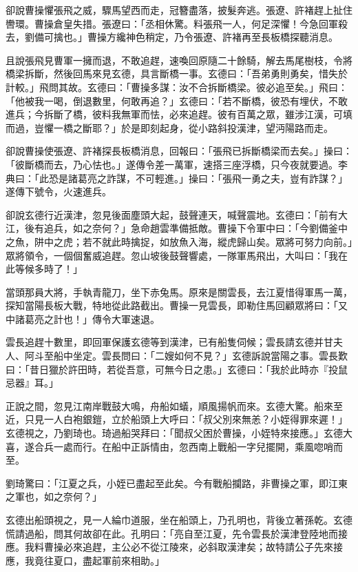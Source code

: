 卻說曹操懼張飛之威，驟馬望西而走，冠簪盡落，披髮奔逃。張遼、許褚趕上扯住轡環。曹操倉皇失措。張遼曰：「丞相休驚。料張飛一人，何足深懼！今急回軍殺去，劉備可擒也。」曹操方纔神色稍定，乃令張遼、許褚再至長板橋探聽消息。

且說張飛見曹軍一擁而退，不敢追趕，速喚回原隨二十餘騎，解去馬尾樹枝，令將橋梁拆斷，然後回馬來見玄德，具言斷橋一事。玄德曰：「吾弟勇則勇矣，惜失於計較。」飛問其故。玄德曰：「曹操多謀：汝不合拆斷橋梁。彼必追至矣。」飛曰：「他被我一喝，倒退數里，何敢再追？」玄德曰：「若不斷橋，彼恐有埋伏，不敢進兵；今拆斷了橋，彼料我無軍而怯，必來追趕。彼有百萬之眾，雖涉江漢，可填而過，豈懼一橋之斷耶？」於是即刻起身，從小路斜投漢津，望沔陽路而走。

卻說曹操使張遼、許褚探長板橋消息，回報曰：「張飛已拆斷橋梁而去矣。」操曰：「彼斷橋而去，乃心怯也。」遂傳令差一萬軍，速搭三座浮橋，只今夜就要過。李典曰：「此恐是諸葛亮之詐謀，不可輕進。」操曰：「張飛一勇之夫，豈有詐謀？」遂傳下號令，火速進兵。

卻說玄德行近漢津，忽見後面塵頭大起，鼓聲連天，喊聲震地。玄德曰：「前有大江，後有追兵，如之奈何？」急命趙雲準備抵敵。曹操下令軍中曰：「今劉備釜中之魚，阱中之虎；若不就此時擒捉，如放魚入海，縱虎歸山矣。眾將可努力向前。」眾將領令，一個個奮威追趕。忽山坡後鼓聲響處，一隊軍馬飛出，大叫曰：「我在此等候多時了！」

當頭那員大將，手執青龍刀，坐下赤兔馬。原來是關雲長，去江夏惜得軍馬一萬，探知當陽長板大戰，特地從此路截出。曹操一見雲長，即勒住馬回顧眾將曰：「又中諸葛亮之計也！」傳令大軍速退。

雲長追趕十數里，即回軍保護玄德等到漢津，已有船隻伺候；雲長請玄德并甘夫人、阿斗至船中坐定。雲長問曰：「二嫂如何不見？」玄德訴說當陽之事。雲長歎曰：「昔日獵於許田時，若從吾意，可無今日之患。」玄德曰：「我於此時亦『投鼠忌器』耳。」

正說之間，忽見江南岸戰鼓大鳴，舟船如蟻，順風揚帆而來。玄德大驚。船來至近，只見一人白袍銀鎧，立於船頭上大呼曰：「叔父別來無恙？小姪得罪來遲！」玄德視之，乃劉琦也。琦過船哭拜曰：「聞叔父困於曹操，小姪特來接應。」玄德大喜，遂合兵一處而行。在船中正訴情由，忽西南上戰船一字兒擺開，乘風唿哨而至。

劉琦驚曰：「江夏之兵，小姪已盡起至此矣。今有戰船攔路，非曹操之軍，即江東之軍也，如之奈何？」

玄德出船頭視之，見一人綸巾道服，坐在船頭上，乃孔明也，背後立著孫乾。玄德慌請過船，問其何故卻在此。孔明曰：「亮自至江夏，先令雲長於漢津登陸地而接應。我料曹操必來追趕，主公必不從江陵來，必斜取漢津矣；故特請公子先來接應，我竟往夏口，盡起軍前來相助。」


